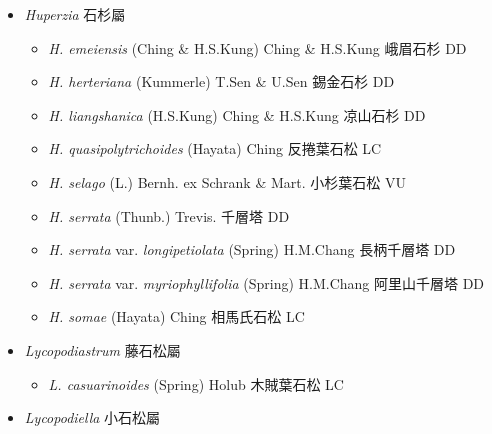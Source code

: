
  \begin{itemize}
 \item[] \textit{Huperzia} 石杉屬
                                
  \begin{itemize}
        \item[] \textit{H. emeiensis} (Ching \& H.S.Kung) Ching \& H.S.Kung  峨眉石杉   DD
        \item[] \textit{H. herteriana} (Kummerle) T.Sen \& U.Sen  錫金石杉   DD
        \item[] \textit{H. liangshanica} (H.S.Kung) Ching \& H.S.Kung  凉山石杉   DD
        \item[] \textit{H. quasipolytrichoides} (Hayata) Ching  反捲葉石松   LC
        \item[] \textit{H. selago} (L.) Bernh. ex Schrank \& Mart.  小杉葉石松   VU
        \item[] \textit{H. serrata} (Thunb.) Trevis.  千層塔   DD
        \item[] \textit{H. serrata} var. \textit{longipetiolata} (Spring) H.M.Chang 
                                        長柄千層塔   DD
        \item[] \textit{H. serrata} var. \textit{myriophyllifolia} (Spring) H.M.Chang 
                                        阿里山千層塔   DD
        \item[] \textit{H. somae} (Hayata) Ching  相馬氏石松   LC
  \end{itemize}
 \item[] \textit{Lycopodiastrum} 藤石松屬
                                
  \begin{itemize}
        \item[] \textit{L. casuarinoides} (Spring) Holub  木賊葉石松   LC
  \end{itemize}
 \item[] \textit{Lycopodiella} 小石松屬
                                

\end{itemize}
